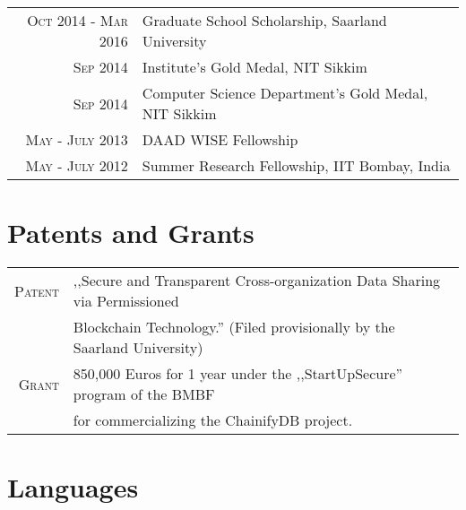 \documentclass[a4paper,10pt]{article} %
\begin{document}
\begin{tabular}{rl}
\textsc{Oct 2014 - Mar 2016} & Graduate School Scholarship, Saarland University\\
\textsc{Sep 2014} & Institute's Gold Medal, NIT Sikkim\\
\textsc{Sep 2014} & Computer Science Department's Gold Medal, NIT Sikkim\\
\textsc{May - July 2013} & DAAD WISE Fellowship\\
\textsc{May - July 2012} & Summer Research Fellowship, IIT Bombay, India\\
\end{tabular}


\section{Patents and Grants}

\begin{tabular}{rl}
\textsc{Patent} & ,,Secure and Transparent Cross-organization Data Sharing via Permissioned\\
&Blockchain Technology.'' (Filed provisionally by the Saarland University)\\
\textsc{Grant} & 850,000 Euros for 1 year under the ,,StartUpSecure'' program of the BMBF\\
& for commercializing the ChainifyDB project.
\end{tabular}

\renewcommand\refname{Publications}
\setlength\bibitemsep{\baselineskip}


\nocite{*}


\section{Languages}
\end{document}
